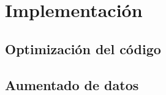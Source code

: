 \chapter{Implementación} \label{ich:implementacion}


\section{Optimización del código} \label{isec:optimizacion_codigo}

\section{Aumentado de datos} \label{isec:aumentado_datos}

